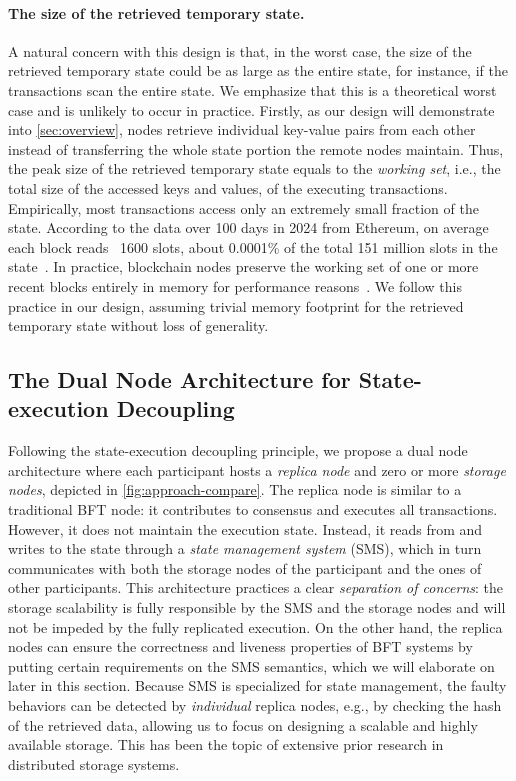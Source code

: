 \paragraph{The size of the retrieved temporary state.}
A natural concern with this design is that, in the worst case, the size of the retrieved temporary state could be as large as the entire state, for instance, if the transactions scan the entire state.
We emphasize that this is a theoretical worst case and is unlikely to occur in practice.
Firstly, as our design will demonstrate into \autoref{sec:overview}, nodes retrieve individual key-value pairs from each other instead of transferring the whole state portion the remote nodes maintain.
Thus, the peak size of the retrieved temporary state equals to the \emph{working set}, i.e., the total size of the accessed keys and values, of the executing transactions.
Empirically, most transactions access only an extremely small fraction of the state.
According to the data over 100 days in 2024 from Ethereum, on average each block reads ~1600 slots, about 0.0001\% of the total 151 million slots in the state~\cite{ProperDiskIO_GasPricing_LRUcache_2024}.
In practice, blockchain nodes preserve the working set of one or more recent blocks entirely in memory for performance reasons~\cite{nodereal2022_bsc_cache_hit_rate}.
We follow this practice in our design, assuming trivial memory footprint for the retrieved temporary state without loss of generality.
 

\subsection{The Dual Node Architecture for State-execution Decoupling}

Following the state-execution decoupling principle, we propose a dual node architecture where each participant hosts a \emph{replica node} and zero or more \emph{storage nodes}, depicted in \autoref{fig:approach-compare}.
The replica node is similar to a traditional BFT node: it contributes to consensus and executes all transactions.
However, it does not maintain the execution state.
Instead, it reads from and writes to the state through a \emph{state management system} (SMS), which in turn communicates with both the storage nodes of the participant and the ones of other participants.
This architecture practices a clear \emph{separation of concerns}: the storage scalability is fully responsible by the SMS and the storage nodes and will not be impeded by the fully replicated execution.
On the other hand, the replica nodes can ensure the correctness and liveness properties of BFT systems by putting certain requirements on the SMS semantics, which we will elaborate on later in this section.
Because SMS is specialized for state management, the faulty behaviors can be detected by \emph{individual} replica nodes, e.g., by checking the hash of the retrieved data, allowing us to focus on designing a scalable and highly available storage.
This has been the topic of extensive prior research in distributed storage systems.


